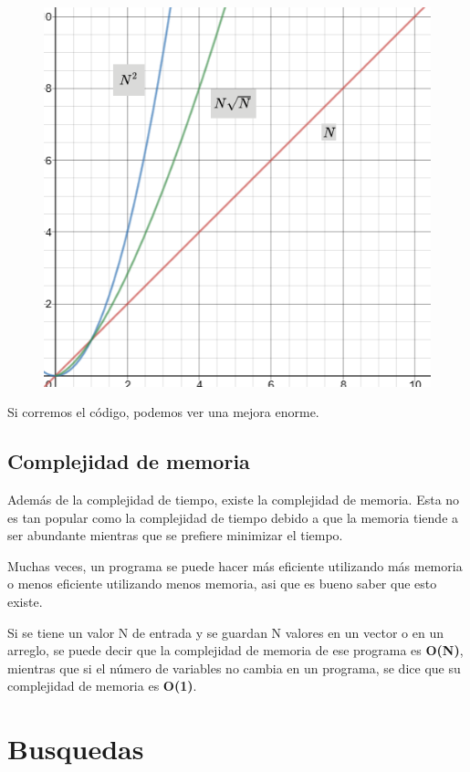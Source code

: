 \documentclass{article}
\begin{document}
\begin{figure}[H]
    \centering
    \includegraphics[width=0.3\paperwidth]{nsquaredn}
\end{figure}

Si corremos el código, podemos ver una mejora enorme.

\subsection{Complejidad de memoria}

Además de la complejidad de tiempo, existe la complejidad de memoria. Esta no es tan popular como la complejidad de tiempo debido a que la memoria tiende a ser abundante mientras que se prefiere minimizar el tiempo.

Muchas veces, un programa se puede hacer más eficiente utilizando más memoria o menos eficiente utilizando menos memoria, asi que es bueno saber que esto existe.

Si se tiene un valor N de entrada y se guardan N valores en un vector o en un arreglo, se puede decir que la complejidad de memoria de ese programa es \textbf{O(N)}, mientras que si el número de variables no cambia en un programa, se dice que su complejidad de memoria es \textbf{O(1)}.

\section{Busquedas}
\end{document}
